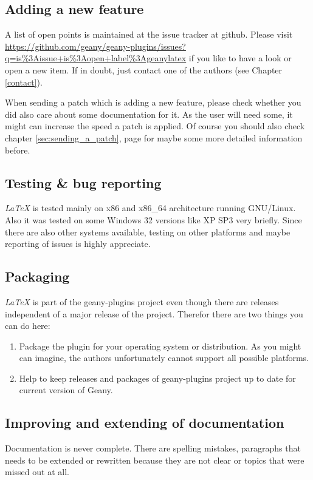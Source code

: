 \documentclass[%
paper=a4,%
fontsize=11pt,%
twoside=false,%
DIV18,%
headsepline,%
plainheadsepline,%
footsepline,%
plainfootsepline,%
bibliography=totoc,%
listof=totoc,%
BCOR10mm,%
parskip=half,%
openany,%
]{scrreprt}
\begin{document}
\subsection{Adding a new feature}

A list of open points is maintained at the issue tracker at github.
Please visit
\url{https://github.com/geany/geany-plugins/issues?q=is%3Aissue+is%3Aopen+label%3Ageanylatex}
if you like to have a look or open a new item. If in doubt, just
contact one of the authors (see Chapter \ref{contact}).

When sending a patch which is adding a new feature, please check
whether you did also care about some documentation for it. As the
user will need some, it might can increase the speed a patch is
applied. Of course you should also check chapter \ref{sec:sending_a_patch},
page \pageref{sec:sending_a_patch} for maybe some more detailed
information before.

\subsection{Testing \& bug reporting} \textit{LaTeX} is tested mainly
on x86 and x86\_64 architecture running GNU/Linux. Also it was
tested on some Windows 32 versions like XP SP3 very briefly. Since
there are also other systems available, testing on other platforms
and maybe reporting of issues is highly appreciate.

\subsection{Packaging}
\textit{LaTeX} is part of the geany-plugins project even though there
are releases independent of a major release of the project. Therefor
there are two things you can do here:
\begin{enumerate}
    \item Package the plugin for your operating system or
    distribution. As you might can imagine, the authors unfortunately
    cannot support all possible platforms.
    \item Help to keep releases and packages of geany-plugins project
    up to date for current version of Geany.
\end{enumerate}


\subsection{Improving and extending of documentation}
Documentation is never complete. There are spelling mistakes,
paragraphs that needs to be extended or rewritten because they are not
clear or topics that were missed out at all.
\end{document}

